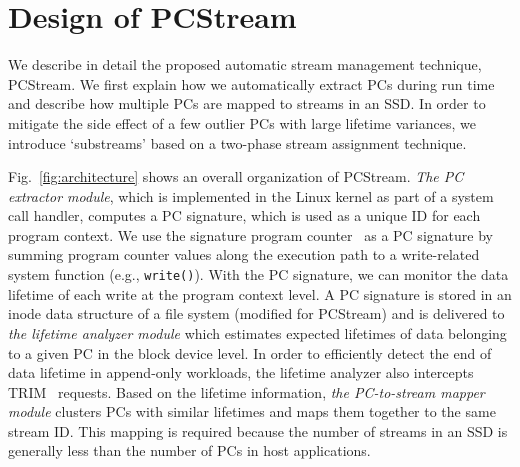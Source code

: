 \vspace{-10pt}
\section{Design of \textsf{\normalsize PCStream}}
\vspace{-8pt}
We describe in detail the proposed automatic stream management technique, 
\textsf{\small PCStream}.  We first explain how we automatically extract PCs during
run time and describe how multiple PCs are mapped to streams in an SSD.
In order to mitigate the side effect of a few outlier PCs with large lifetime variances, 
we introduce `substreams' based on a two-phase
stream assignment technique.


Fig.~\ref{fig:architecture} shows an overall organization of \textsf{\small PCStream}.
\textit{The PC extractor module}, which is implemented in the Linux kernel as
part of a system call handler, 
computes a PC signature, which is used as a unique ID for each program context.  
We use the signature program counter~\cite{PC} as a PC signature 
by summing program counter values along the execution path to a write-related system function 
(e.g., {\tt write()}).  
With the PC signature, we can monitor the data lifetime of each write at the program context level. 
A PC signature is stored
in an inode data structure of a file system (modified for \textsf{\small PCStream})
and is delivered to \textit{the lifetime analyzer module} which estimates
expected lifetimes of data belonging to a given PC in the block device level.
In order to efficiently detect the end of data lifetime in append-only
workloads, the lifetime analyzer also intercepts TRIM~\cite{TRIM} requests. %
Based on the lifetime information, \textit{the PC-to-stream
mapper module} clusters PCs with similar lifetimes and maps them together to
the same stream ID.  This mapping is required because 
the number of streams in an SSD is generally less than the number of PCs in host applications.

\vspace{-13pt}
